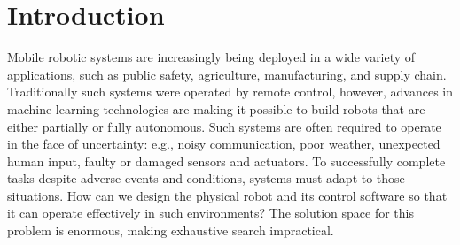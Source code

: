 \section{Introduction}
\label{s:intro}



Mobile robotic systems are increasingly being deployed in a wide variety of
applications, such as public safety, agriculture, manufacturing, and supply chain. 
%
Traditionally such systems were operated by remote control, however,
advances in machine learning technologies are making it possible to build robots
that are either partially or fully autonomous.  
%
Such systems are often required to operate
in the face of uncertainty:
e.g., noisy communication, poor weather,
unexpected human input, faulty or damaged sensors and actuators.
To successfully complete tasks despite adverse events and conditions,
systems must adapt to those situations.
How can we design the physical robot and its control software so that 
it can operate effectively in such environments? 
The solution space for this problem is enormous, making exhaustive search impractical.

